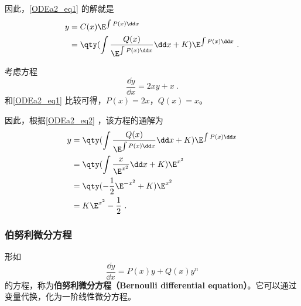 因此，\autoref{ODEa2_eq1} 的解就是
\begin{equation}\label{ODEa2_eq2}
\begin{aligned}
y&=C(x)\E^{\int P(x)\dd x}\\
&=\qty(\int\frac{Q(x)}{\E^{\int P(x)\dd x}}\dd x+K)\E^{\int P(x)\dd x}~.
\end{aligned}
\end{equation}

\begin{example}{}
考虑方程
\begin{equation}
\frac{\dd y}{\dd x}=2xy+x~.
\end{equation}
和\autoref{ODEa2_eq1} 比较可得，$P(x)=2x$，$Q(x)=x$。

因此，根据\autoref{ODEa2_eq2} ，该方程的通解为
\begin{equation}
\begin{aligned}
y&=\qty(\int\frac{Q(x)}{\E^{\int P(x)\dd x}}\dd x+K)\E^{\int P(x)\dd x}\\
&=\qty(\int\frac{x}{\E^{x^2}}\dd x+K)\E^{x^2}\\
&=\qty(-\frac{1}{2}\E^{-x^2}+K)\E^{x^2}\\
&=K\E^{x^2}-\frac{1}{2}~.
\end{aligned}
\end{equation}
\end{example}

\subsubsection{伯努利微分方程}
形如
\begin{equation}
\frac{\dd y}{\dd x}=P(x)y+Q(x)y^n
\end{equation}
的方程，称为\textbf{伯努利微分方程（Bernoulli differential equation）}。它可以通过变量代换，化为一阶线性微分方程。



















